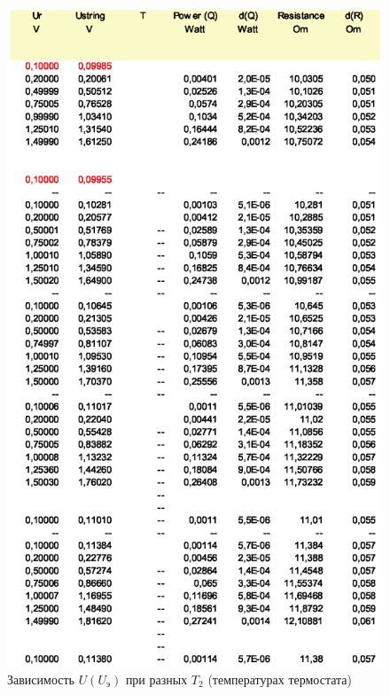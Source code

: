 \documentclass[a4paper,12pt]{article}
\begin{document}
\begin{figure}[ht]
\centering
\includegraphics[width=140mm]{table0.eps}
\caption{Зависимость $U(U_\text{э})$ при разных $T_2$ (температурах термостата)}
\label{table-all}
\end{figure}
\end{document}
